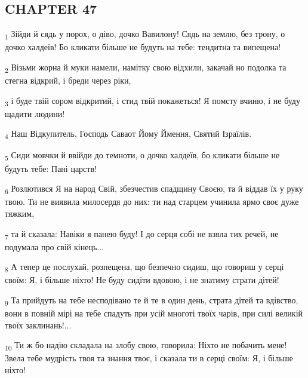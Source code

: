 \subsection{CHAPTER 47}
\begin{tcolorbox}
\textsubscript{1} Зійди й сядь у порох, о діво, дочко Вавилону! Сядь на землю, без трону, о дочко халдеїв! Бо кликати більше не будуть на тебе: тендитна та випещена!
\end{tcolorbox}
\begin{tcolorbox}
\textsubscript{2} Візьми жорна й муки намели, намітку свою відхили, закачай но подолка та стегна відкрий, і бреди через ріки,
\end{tcolorbox}
\begin{tcolorbox}
\textsubscript{3} і буде твій сором відкритий, і стид твій покажеться! Я помсту вчиню, і не буду щадити людини!
\end{tcolorbox}
\begin{tcolorbox}
\textsubscript{4} Наш Відкупитель, Господь Саваот Йому Ймення, Святий Ізраїлів.
\end{tcolorbox}
\begin{tcolorbox}
\textsubscript{5} Сиди мовчки й ввійди до темноти, о дочко халдеїв, бо кликати більше не будуть тебе: Пані царств!
\end{tcolorbox}
\begin{tcolorbox}
\textsubscript{6} Розлютився Я на народ Свій, збезчестив спадщину Своєю, та й віддав їх у руку твою. Ти не виявила милосердя до них: ти над старцем учинила ярмо своє дуже тяжким,
\end{tcolorbox}
\begin{tcolorbox}
\textsubscript{7} та й сказала: Навіки я панею буду! І до серця собі не взяла тих речей, не подумала про свій кінець...
\end{tcolorbox}
\begin{tcolorbox}
\textsubscript{8} А тепер це послухай, розпещена, що безпечно сидиш, що говориш у серці своїм: Я, і більше ніхто! Не буду сидіти вдовою, і не знатиму страти дітей!
\end{tcolorbox}
\begin{tcolorbox}
\textsubscript{9} Та прийдуть на тебе несподівано те й те в один день, страта дітей та вдівство, вони в повній мірі на тебе спадуть при усій многоті твоїх чарів, при силі великій твоїх заклинань!...
\end{tcolorbox}
\begin{tcolorbox}
\textsubscript{10} Ти ж бо надію складала на злобу свою, говорила: Ніхто не побачить мене! Звела тебе мудрість твоя та знання твоє, і сказала ти в серці своїм: Я, і більше ніхто!
\end{tcolorbox}
